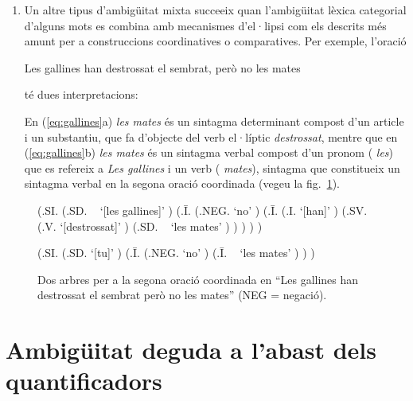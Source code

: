 \begin{enumerate}
  \item Un altre tipus d'ambigüitat mixta succeeix quan l'ambigüitat
    lèxica categorial d'alguns mots es combina amb mecanismes
    d'el·lipsi com els descrits més amunt per a construccions
    coordinatives o comparatives.  Per exemple, l'oració
    \begin{exemple}
    Les gallines han destrossat el sembrat, però no les
        mates
    \end{exemple}
    té dues interpretacions:
    En (\ref{eq:gallines}a) \emph{les mates} és un sintagma
    determinant compost d'un article i un substantiu, que fa d'objecte del
    verb el·líptic \emph{destrossat}, mentre que en (\ref{eq:gallines}b)
    \emph{les mates} és un sintagma verbal compost d'un pronom ({\em
      les}) que es refereix a \emph{Les gallines} i un verb ({\em
      mates}), sintagma que constitueix un sintagma verbal en la
    segona oració coordinada (vegeu la fig.~\ref{fg:mates}).
\end{enumerate}

\begin{figure}
\begin{center}
\begin{parsetree}
(.SI. (.SD. ~ `[les gallines]' ) (.{\={I}}. (.NEG. `no' )
(.{\={I}}. (.I. `[han]' ) (.SV. (.V. `[destrossat]' )  (.SD. ~ `les
mates' ) ) ) ) ) 
\end{parsetree}
\end{center}
\begin{center}
\begin{parsetree}
(.SI. (.SD. `[tu]' ) (.{\={I}}. (.NEG. `no' ) (.{\={I}}. ~ `les mates'
) ) )
\end{parsetree}
\end{center}
\caption{Dos arbres per a la segona oració coordinada en ``Les
  gallines han destrossat el sembrat però no les mates'' (NEG =
  negació).}
\label{fg:mates}
\end{figure}


\section[Ambigüitat deguda als quantificadors]{Ambigüitat deguda a l'abast dels quantificadors}
\label{ss:ambabast}

